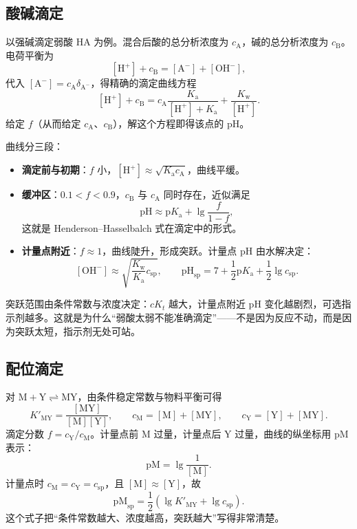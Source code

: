 \documentclass[UTF8]{ctexbook}
\begin{document}
\subsection{酸碱滴定}

以强碱滴定弱酸 $\mathrm{HA}$ 为例。混合后酸的总分析浓度为 $c_{\mathrm{A}}$，碱的总分析浓度为 $c_{\mathrm{B}}$。电荷平衡为
\[
[\mathrm{H^+}]+c_{\mathrm{B}}=[\mathrm{A^-}]+[\mathrm{OH^-}],
\]
代入 $[\mathrm{A^-}]=c_{\mathrm{A}}\delta_{\mathrm{A^-}}$，得精确的滴定曲线方程
\[
[\mathrm{H^+}]+c_{\mathrm{B}}
=c_{\mathrm{A}}\frac{K_{\mathrm{a}}}{[\mathrm{H^+}]+K_{\mathrm{a}}}+\frac{K_{\mathrm{w}}}{[\mathrm{H^+}]}.
\]
给定 $f$（从而给定 $c_{\mathrm{A}}$、$c_{\mathrm{B}}$），解这个方程即得该点的 $\mathrm{pH}$。

曲线分三段：
\begin{itemize}
  \item \textbf{滴定前与初期}：$f$ 小，$[\mathrm{H^+}]\approx\sqrt{K_{\mathrm{a}}c_{\mathrm{A}}}$，曲线平缓。
  \item \textbf{缓冲区}：$0.1<f<0.9$，$c_{\mathrm{B}}$ 与 $c_{\mathrm{A}}$ 同时存在，近似满足
  \[
  \mathrm{pH}\approx\mathrm{p}K_{\mathrm{a}}+\lg\frac{f}{1-f},
  \]
  这就是 Henderson--Hasselbalch 式在滴定中的形式。
  \item \textbf{计量点附近}：$f\approx1$，曲线陡升，形成突跃。计量点 $\mathrm{pH}$ 由水解决定：
  \[
  [\mathrm{OH^-}]\approx\sqrt{\frac{K_{\mathrm{w}}}{K_{\mathrm{a}}}c_{\mathrm{sp}}},
  \qquad
  \mathrm{pH}_{\mathrm{sp}}=7+\frac{1}{2}\mathrm{p}K_{\mathrm{a}}+\frac{1}{2}\lg c_{\mathrm{sp}}.
  \]
\end{itemize}

突跃范围由条件常数与浓度决定：$cK_t$ 越大，计量点附近 $\mathrm{pH}$ 变化越剧烈，可选指示剂越多。这就是为什么“弱酸太弱不能准确滴定”——不是因为反应不动，而是因为突跃太短，指示剂无处可站。

\subsection{配位滴定}

对 $\mathrm{M}+\mathrm{Y}\rightleftharpoons\mathrm{MY}$，由条件稳定常数与物料平衡可得
\[
K'_{\mathrm{MY}}=\frac{[\mathrm{MY}]}{[\mathrm{M}][\mathrm{Y}]},
\qquad
c_{\mathrm{M}}=[\mathrm{M}]+[\mathrm{MY}],
\qquad
c_{\mathrm{Y}}=[\mathrm{Y}]+[\mathrm{MY}].
\]
滴定分数 $f=c_{\mathrm{Y}}/c_{\mathrm{M}}$。计量点前 $\mathrm{M}$ 过量，计量点后 $\mathrm{Y}$ 过量，曲线的纵坐标用 $\mathrm{pM}$ 表示：
\[
\mathrm{pM}=\lg\frac{1}{[\mathrm{M}]}.
\]
计量点时 $c_{\mathrm{M}}=c_{\mathrm{Y}}=c_{\mathrm{sp}}$，且 $[\mathrm{M}]\approx[\mathrm{Y}]$，故
\[
\mathrm{pM}_{\mathrm{sp}}=\frac{1}{2}\left(\lg K'_{\mathrm{MY}}+\lg c_{\mathrm{sp}}\right).
\]
这个式子把“条件常数越大、浓度越高，突跃越大”写得非常清楚。
\end{document}

